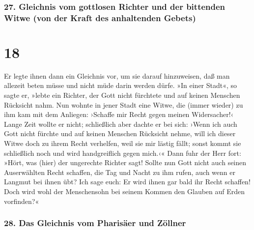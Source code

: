 \hypertarget{gleichnis-vom-gottlosen-richter-und-der-bittenden-witwe-von-der-kraft-des-anhaltenden-gebets}{%
\subsubsection{27. Gleichnis vom gottlosen Richter und der bittenden
Witwe (von der Kraft des anhaltenden
Gebets)}\label{gleichnis-vom-gottlosen-richter-und-der-bittenden-witwe-von-der-kraft-des-anhaltenden-gebets}}

\hypertarget{section-17}{%
\section{18}\label{section-17}}

 Er legte ihnen dann ein Gleichnis vor, um sie darauf
hinzuweisen, daß man allezeit beten müsse und nicht müde darin werden
dürfe.  »In einer Stadt«, so sagte er, »lebte ein Richter,
der Gott nicht fürchtete und auf keinen Menschen Rücksicht nahm.
 Nun wohnte in jener Stadt eine Witwe, die (immer wieder)
zu ihm kam mit dem Anliegen: ›Schaffe mir Recht gegen meinen
Widersacher!‹  Lange Zeit wollte er nicht; schließlich
aber dachte er bei sich: ›Wenn ich auch Gott nicht fürchte und auf
keinen Menschen Rücksicht nehme,  will ich dieser Witwe
doch zu ihrem Recht verhelfen, weil sie mir lästig fällt; sonst kommt
sie schließlich noch und wird handgreiflich gegen mich.‹« 
Dann fuhr der Herr fort: »Hört, was (hier) der ungerechte Richter sagt!
 Sollte nun Gott nicht auch seinen Auserwählten Recht
schaffen, die Tag und Nacht zu ihm rufen, auch wenn er Langmut bei ihnen
übt?  Ich sage euch: Er wird ihnen gar bald ihr Recht
schaffen! Doch wird wohl der Menschensohn bei seinem Kommen den Glauben
auf Erden vorfinden?«

\hypertarget{das-gleichnis-vom-pharisuxe4er-und-zuxf6llner}{%
\subsubsection{28. Das Gleichnis vom Pharisäer und
Zöllner}\label{das-gleichnis-vom-pharisuxe4er-und-zuxf6llner}}

